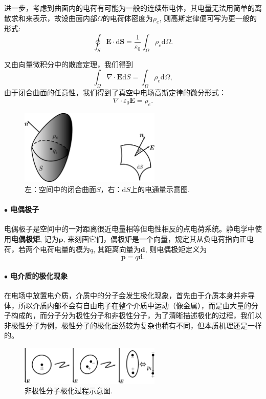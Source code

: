 \documentclass[10pt,reqno, final]{ctexart}
\begin{document}
进一步，考虑到曲面内的电荷有可能为一般的连续带电体，其电量无法用简单的离散求和来表示，故设曲面内部$\Omega$的电荷体密度为$\rho_e$,  则高斯定律便可写为更一般的形式:
\begin{equation}\label{gaussint}
\displaystyle \oint_{S}\bm{E}\cdot \mathrm{d}\bm{S} =\frac{1}{\varepsilon_0} \int_\Omega \rho_e \mathrm{d}\Omega.
\end{equation}

又由向量微积分中的散度定理，我们得到
\begin{equation}\label{gaussdiv}
\int_\Omega \nabla\cdot \bm{E} \mathrm{d}S = \int_\Omega \rho_e\mathrm{d}\Omega,
\end{equation}
由于闭合曲面的任意性，我们得到了真空中电场高斯定律的微分形式：
\begin{equation}\label{gaussthmdiff}
\nabla\cdot \varepsilon_0 \bm{E} = \rho_e.
\end{equation}

\begin{figure}[htp]
	\centering
	\includegraphics[width=0.6\textwidth]{Figures/GaussThmFig}
	\caption {左：空间中的闭合曲面$S$，右：$\mathrm{d}S$上的电通量示意图. }
	\label{gaussthm}
\end{figure}
\newpage

\paragraph{$\bullet$ 电偶极子} 电偶极子是空间中的一对距离很近电量相等但电性相反的点电荷系统。静电学中使用\textbf{电偶极矩}, 记为$\bm{p}$, 来刻画它们，偶极矩是一个向量，规定其从负电荷指向正电荷，若两个电荷电量的模为$q$, 其距离向量为$\bm{d}$, 则电偶极矩定义为
\begin{equation}\label{dipole}
\bm{p} = q\bm{d}.
\end{equation}

\paragraph{$\bullet$ 电介质的极化现象} 在电场中放置电介质，介质中的分子会发生极化现象，首先由于介质本身并非导体，所以介质内部不会有自由电子在整个介质中运动（像金属），而是由大量的分子构成的，而分子分为极性分子和非极性分子，为了清晰描述极化的过程，我们以非极性分子为例，极性分子的极化虽然较为复杂也稍有不同，但本质机理还是一样的。
\begin{figure}[htp]
	\centering
	\includegraphics[width=0.6\textwidth]{Figures/polarlization}
	\caption {非极性分子极化过程示意图. }
	\label{polarlization}
\end{figure}
\end{document}
